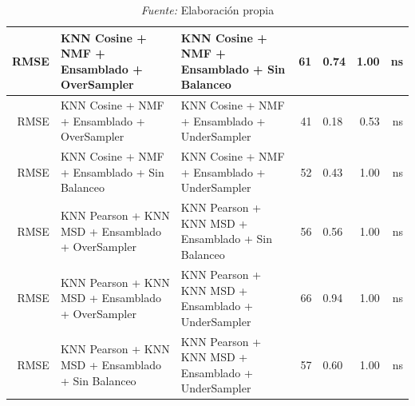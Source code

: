 \begin{table}[H]
\begin{tabular}{rp{4cm}p{4cm}rlrr}
        RMSE & KNN Cosine + NMF + Ensamblado + OverSampler & KNN Cosine + NMF + Ensamblado + Sin Balanceo & 61 & 0.74 & 1.00 & ns \\ \hline
        RMSE & KNN Cosine + NMF + Ensamblado + OverSampler & KNN Cosine + NMF + Ensamblado + UnderSampler & 41 & 0.18 & 0.53 & ns \\ \hline
        RMSE & KNN Cosine + NMF + Ensamblado + Sin Balanceo & KNN Cosine + NMF + Ensamblado + UnderSampler & 52 & 0.43 & 1.00 & ns \\ \hline
        RMSE & KNN Pearson + KNN MSD + Ensamblado + OverSampler & KNN Pearson + KNN MSD + Ensamblado + Sin Balanceo & 56 & 0.56 & 1.00 & ns \\ \hline
        RMSE & KNN Pearson + KNN MSD + Ensamblado + OverSampler & KNN Pearson + KNN MSD + Ensamblado + UnderSampler & 66 & 0.94 & 1.00 & ns \\ \hline
        RMSE & KNN Pearson + KNN MSD + Ensamblado + Sin Balanceo & KNN Pearson + KNN MSD + Ensamblado + UnderSampler & 57 & 0.60 & 1.00 & ns \\ \hline
    \end{tabular}
    \caption*{\small\textit{Fuente:} Elaboración propia}
\end{table}

